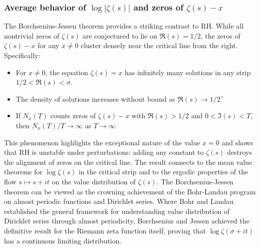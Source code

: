 \documentclass{article}
\begin{document}
   \subsubsection{Average behavior of $\log |\zeta(s)|$ and zeros of $\zeta(s)-x$}  The Borchsenius-Jessen theorem \cite{BorchJessen} provides a striking contrast to RH. While all nontrivial zeros of $\zeta(s)$ are conjectured to lie on $\Re(s) = 1/2$, the zeros of $\zeta(s) - x$ for any $x \neq 0$ cluster densely near the critical line from the right. Specifically:
    \begin{itemize}
        \item For $x \neq 0$, the equation $\zeta(s) = x$ has infinitely many solutions in any strip $1/2 < \Re(s) < \sigma.$
        \item The density of solutions increases without bound as $\Re(s) \to 1/2^+$
        \item If $N_x(T)$ counts zeros of $\zeta(s)-x$ with $\Re(s) > 1/2$ and $0 < \Im(s) < T$, then $N_x(T)/T \to \infty$ as $T \to \infty$
    \end{itemize}
    This phenomenon highlights the exceptional nature of the value $x = 0$ and shows that RH is unstable under perturbations: adding any constant to $\zeta(s)$ destroys the alignment of zeros on the critical line. The result connects to the mean value theorems for $\log \zeta(s)$ in the critical strip and  to the ergodic properties of the flow $s \mapsto s + it$ on the value distribution of $\zeta(s)$. The Borchsenius-Jessen theorem can be viewed as the crowning achievement of the Bohr-Landau program on almost periodic functions and Dirichlet series. Where Bohr and Landau established the general framework for understanding value distribution of Dirichlet series through almost periodicity, Borchsenius and Jessen achieved the definitive result for the Riemann zeta function itself, proving  
that $\log \zeta(\sigma+i t)$ has a continuous limiting distribution.
\end{document}

